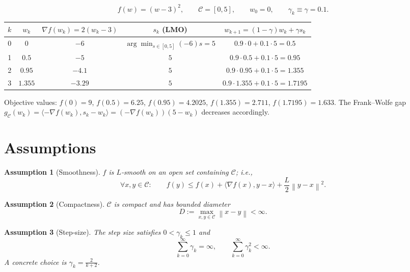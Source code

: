 \documentclass{article}
\newtheorem{assumption}{Assumption}
\newcommand{\norm}[1]{\left\lVert #1\right\rVert}
\newcommand{\ip}[2]{\langle #1,#2\rangle}
\begin{document}
\[
f(w) = (w-3)^2,\qquad\mathcal C=[0,5],\qquad w_0=0,\qquad \gamma_k\equiv\gamma=0.1 .
\]

\begin{center}
\begin{tabular}{c|c|c|c|c}
$k$ & $w_k$ & $\nabla f(w_k)=2(w_k-3)$ & $s_k$ (LMO) & $w_{k+1}=(1-\gamma)w_k+\gamma s_k$ \\ \hline
0 & $0$ & $-6$ & $\displaystyle\arg\min_{s\in[0,5]}(-6)s =5$ & $0.9\cdot0+0.1\cdot5 = 0.5$ \\[4pt]
1 & $0.5$ & $-5$ & $5$ & $0.9\cdot0.5+0.1\cdot5 = 0.95$ \\[4pt]
2 & $0.95$ & $-4.1$ & $5$ & $0.9\cdot0.95+0.1\cdot5 = 1.355$ \\[4pt]
3 & $1.355$ & $-3.29$ & $5$ & $0.9\cdot1.355+0.1\cdot5 = 1.7195$
\end{tabular}
\end{center}

Objective values: $f(0)=9$, $f(0.5)=6.25$, $f(0.95)=4.2025$, $f(1.355)=2.711$, $f(1.7195)=1.633$.
The Frank–Wolfe gap $g_{\mathcal C}(w_k)=\ip{-\nabla f(w_k)}{s_k-w_k}=(-\nabla f(w_k))(5-w_k)$ decreases accordingly.

\section*{Assumptions}
\begin{assumption}[Smoothness]\label{ass:smooth}
$f$ is $L$‑smooth on an open set containing $\mathcal C$; i.e.,
\[
\forall x,y\in\mathcal C:\qquad 
f(y)\le f(x)+\ip{\nabla f(x)}{y-x}+\frac{L}{2}\norm{y-x}^2 .
\]
\end{assumption}

\begin{assumption}[Compactness]\label{ass:compact}
$\mathcal C$ is compact and has bounded diameter
\[
D := \max_{x,y\in\mathcal C}\norm{x-y}<\infty .
\]
\end{assumption}

\begin{assumption}[Step‑size]\label{ass:stepsize}
The step size satisfies $0<\gamma_k\le 1$ and
\[
\sum_{k=0}^{\infty}\gamma_k = \infty,\qquad 
\sum_{k=0}^{\infty}\gamma_k^2 < \infty .
\]
A concrete choice is $\gamma_k = \frac{2}{k+2}$.
\end{assumption}
\end{document}
